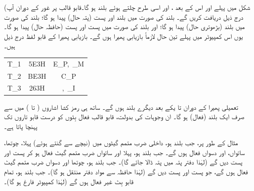 (شکل   میں پہلے  اور اس کے بعد  ، اور اسی طرح چلتے ہوئے    بلند ہو گا۔قابو قالب پر غور کے دوران آپ درج ذیل دریافت کریں گے۔ بلند  کی صورت میں بلند  اور پست  (پتہ  حال)  پیدا ہو گا؛ بلند  کی صورت میں  بلند  (بڑھوتری  حال) پیدا ہو گا؛ اور بلند  کی صورت میں پست  اور پست   (حافظہ حال) پیدا ہو گا۔ یوں اس کمپیوٹر میں پہلے تین  حال لازماً  بازیابی پھیرا ہوں گے۔ بازیابی پھیرا کے قابو لفظ درج ذیل ہیں۔
\begin{center}
\begin{tabular}{CCC}
\toprule
{}&&\\
\midrule
T_1&5E3H&E_P,\, _M\\
T_2&BE3H&C_P\\
T_3&263H&,\, _I\\
\bottomrule
\end{tabular}
\end{center}

تعمیلی پھیرا کے دوران  تا  یکے بعد دیگرے  بلند  ہوں گے۔ ساتھ ہی رمز کشا اشاروں (  تا ) میں سے صرف ایک  بلند (فعال) ہو گا۔ ان وجوہات کی بدولت،  قابو قالب  فعال بِٹوں کو   درست  قابو تاروں تک پہنچا پاتا  ہے۔

مثال کے طور پر، جب بلند ہو،   داخلی ضرب متمم گیٹوں میں (نیچے سے گنتے ہوئے)   پہلا، چوتھا، ساتواں، اور دسواں فعال ہوں گے۔ جب  بلند ہو، پہلا اور ساتواں ضرب متمم  گیٹ فعال ہو کر پست  اور پست    دیں گے  (لہٰذا  دفتر پتہ میں پتہ  ڈالا جائے گا)۔ جب  بلند ہو، چوتھا اور  دسواں ضرب متمم گیٹ فعال ہوں گے، جو پست  اور  پست  دیں گے (لہٰذا حافظہ سے مواد دفتر  منتقل ہو گا)۔ جب  بلند ہو، تمام قابو بِٹ  غیر فعال ہوں گے (لہٰذا کمپیوٹر فارغ ہو گا)۔

